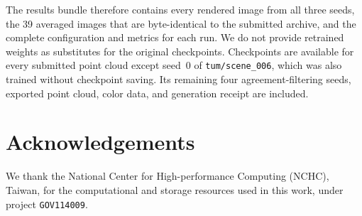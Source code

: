 \documentclass[10pt,twocolumn,letterpaper]{article}
\newcommand{\code}[1]{\texttt{\small #1}}
\begin{document}
The results bundle therefore contains every rendered image from all three seeds,
the 39 averaged images that are byte-identical to the submitted archive, and the
complete configuration and metrics for each run. We do not provide retrained
weights as substitutes for the original checkpoints. Checkpoints are available
for every submitted point cloud except seed~0 of \code{tum/scene\_006}, which was
also trained without checkpoint saving. Its remaining four agreement-filtering
seeds, exported point cloud, color data, and generation receipt are included.

\section*{Acknowledgements}

We thank the National Center for High-performance Computing (NCHC), Taiwan, for
the computational and storage resources used in this work, under project
\code{GOV114009}.

{\small


}
\end{document}

